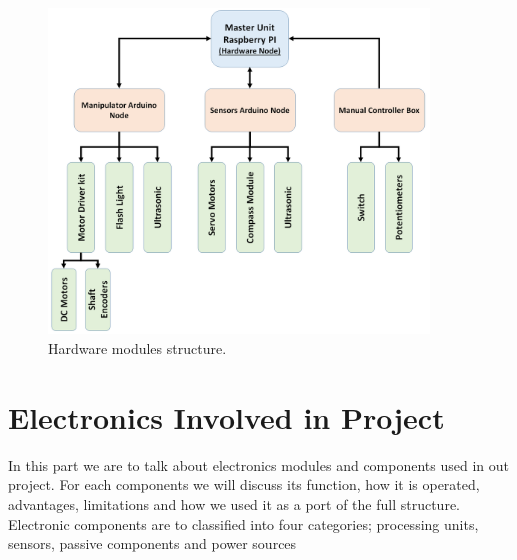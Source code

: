 \documentclass[12pt]{book}
\begin{document}
\begin{itemize}
	\begin{figure}
		\centering
		\includegraphics[width =0.9\textwidth]{Fig/hardware-structure.png}
		\caption{Hardware modules structure.}
		\label{fig:harware-structure}
	\end{figure}

	
\end{itemize}
 

\section{Electronics Involved in Project}
In this part we are to talk about electronics modules and components used in out project. For each components we will discuss its function, how it is operated, advantages, limitations and how we used it as a port of the full structure. Electronic components are to classified into four categories; processing units, sensors, passive components and power sources
\end{document}
